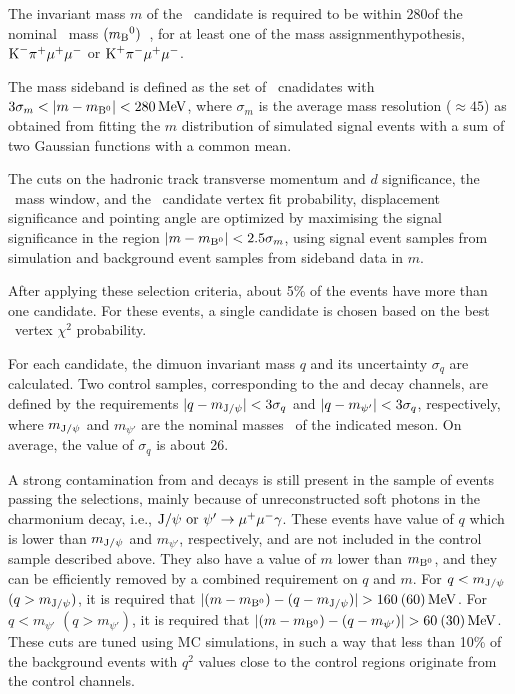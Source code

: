 The invariant mass $m$ of the \PBz\ candidate is required to be within 280\MeV of the nominal \PBz\ mass $(m_{\textrm{B}}{}^{0})$~\cite{PDG}, for at least one of the mass assignmenthypothesis, $\textrm{K}^{-}\pi^{+}\mu^{+}\mu^{-}$ or $\textrm{K}^{+}\pi^{-}\mu^{+}\mu^{-}$.

The mass sideband is defined as the set of \PBz\ cnadidates with $3\sigma_m < \lvert m-m_{{\textrm{B}}{}^{0}}\rvert < 280\,\textrm{MeV}$, where $\sigma_m$ is the average mass resolution (${\approx}45$\MeV) as obtained from fitting the $m$ distribution of simulated signal events with a sum of two Gaussian functions with a common mean.

The cuts on the hadronic track transverse momentum and $d$ significance, the \cPKstz\ mass window, and the \PBz\ candidate vertex fit probability, displacement significance and pointing angle are optimized by maximising the signal significance in the region $\lvert m-m_{{\textrm{B}}{}^{0}}\rvert < 2.5\sigma_m$, using signal event samples from simulation and background event samples from sideband data in $m$.

After applying these selection criteria, about 5\% of the events have more than one candidate.
For these events, a single candidate is chosen based on the best \PBz\ vertex $\chi^2$ probability.

For each candidate, the dimuon invariant mass $q$ and its uncertainty $\sigma_{q}$ are calculated.
Two control samples, corresponding to the \BtoKstJpsi and \BtoKstpsip decay channels, are defined by the requirements $\lvert q - m_{\textrm{J}/\psi}\rvert < 3\sigma_{q}$ and $\lvert q - m_{\psi'}\rvert < 3\sigma_{q}$, respectively, where $m_{\textrm{J}/\psi}$ and $m_{\psi'}$ are the nominal masses~\cite{PDG} of the indicated meson.
On average, the value of $\sigma_{q}$ is about 26\MeV.

A strong contamination from \BtoKstJpsi and \BtoKstpsip decays is still present in the sample of events passing the selections, mainly because of unreconstructed soft photons in the charmonium decay, i.e., $\textrm{J}/\psi\ {\rm or}\ \psi' \to \mu^{+} \mu^{-} \gamma$.
These events have value of $q$ which is lower than $m_{\textrm{J}/\psi}$ and $m_{\psi'}$, respectively, and are not included in the control sample described above.
They also have a value of $m$ lower than $m_{{\textrm{B}}{}^{0}}$, and they can be efficiently removed by a combined requirement on $q$ and $m$.
For $q<m_{\textrm{J}/\psi}$ $(q>m_{\textrm{J}/\psi})$, it is required that $\lvert(m-m_{{\textrm{B}}{}^{0}})-(q-m_{\textrm{J}/\psi})\rvert>160\: (60)\,\textrm{MeV}$.
For $q<m_{\psi'}$ $(q>m_{\psi'})$, it is required that $\lvert(m-m_{{\textrm{B}}{}^{0}})-(q-m_{\psi'})\rvert>60\: (30)\,\textrm{MeV}$.
These cuts are tuned using MC simulations, in such a way that less than 10\% of the background events with $q^2$ values close to the control regions originate from the control channels.

